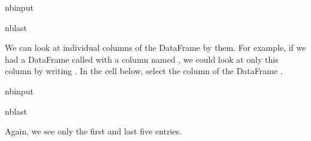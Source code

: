 \documentclass[letterpaper,10pt,english]{sphinxmanual}
\begin{document}
\begin{sphinxuseclass}{nbinput}
\begin{sphinxuseclass}{nblast}
{
\begin{sphinxVerbatim}[commandchars=\\\{\}]
\llap{\color{nbsphinxin}[ ]:\,\hspace{\fboxrule}\hspace{\fboxsep}}  
\end{sphinxVerbatim}
}

\end{sphinxuseclass}
\end{sphinxuseclass}
\sphinxAtStartPar
We can look at individual columns of the DataFrame by  them. For example, if we had a DataFrame called  with a column named , we could look at only this column by writing . In the cell below, select the  column of the DataFrame .

\begin{sphinxuseclass}{nbinput}
\begin{sphinxuseclass}{nblast}
{
\begin{sphinxVerbatim}[commandchars=\\\{\}]
\llap{\color{nbsphinxin}[ ]:\,\hspace{\fboxrule}\hspace{\fboxsep}}
\end{sphinxVerbatim}
}

\end{sphinxuseclass}
\end{sphinxuseclass}
\sphinxAtStartPar
Again, we see only the first and last five entries.
\end{document}
